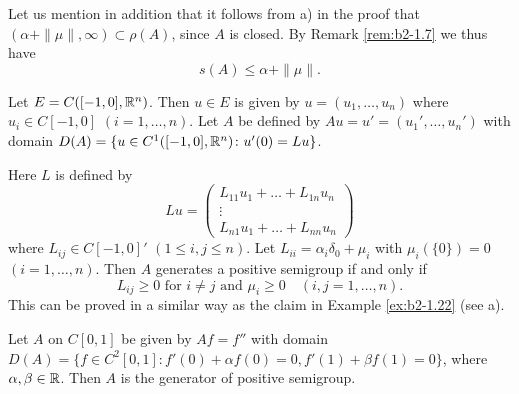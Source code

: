 Let us mention in addition that it follows from a) in the proof that $(\alpha + \|\mu\|, \infty) \subset \rho(A)$, since $A$ is closed.
By Remark \ref{rem:b2-1.7} we thus have
\begin{equation}\label{eq:b2-1.14}
s(A) \leq \alpha + \|\mu\|.
\end{equation}
\begin{example}\label{ex:b2-1.23}
Let $E = C([-1,0],\mathbb{R}^{n})$.
Then $u \in E$ is given by $u = (u_{1},\ldots,u_{n})$ where $u_{i} \in C[-1,0]$ $(i=1,\ldots,n)$.
Let $A$ be defined by $Au = u' = (u_{1}',\ldots,u_{n}')$ with domain $D(A) = \{u \in C^{1}([-1,0],\mathbb{R}^{n}) \colon u'(0) = Lu\}$.

Here $L$ is defined by
\[
    Lu = \begin{pmatrix}
        L_{11}u_{1} + \ldots + L_{1n}u_{n} \\
        \vdots \\
        L_{n1}u_{1} + \ldots + L_{nn}u_{n}
    \end{pmatrix}
\]
where $L_{ij} \in C[-1,0]'$ $(1 \leq i,j \leq n)$.
Let $L_{ii} = \alpha_{i}\delta_{0} + \mu_{i}$ with $\mu_{i}(\{0\}) = 0$ $(i = 1,\ldots,n)$.
Then $A$ generates a positive semigroup if and only if 
\[
L_{ij} \geq 0 \text{ for } i \neq j \text{ and } \mu_{i} \geq 0 \quad (i,j = 1,\ldots,n) .
\]
This can be proved in a similar way as the claim in Example  \ref{ex:b2-1.22} 
(see \citet{arendt:1984a}a).
\end{example}

\begin{example}\label{ex:b2-1.24}
Let $A$ on $C[0,1]$ be given by $Af = f''$ with domain 
$D(A) = \{f \in C^{2}[0,1] \colon f'(0) + \alpha f(0) = 0, f'(1) + \beta f(1) = 0\}$, where $\alpha,\beta \in \mathbb{R}$.
Then $A$ is the generator of positive semigroup.
\end{example}

